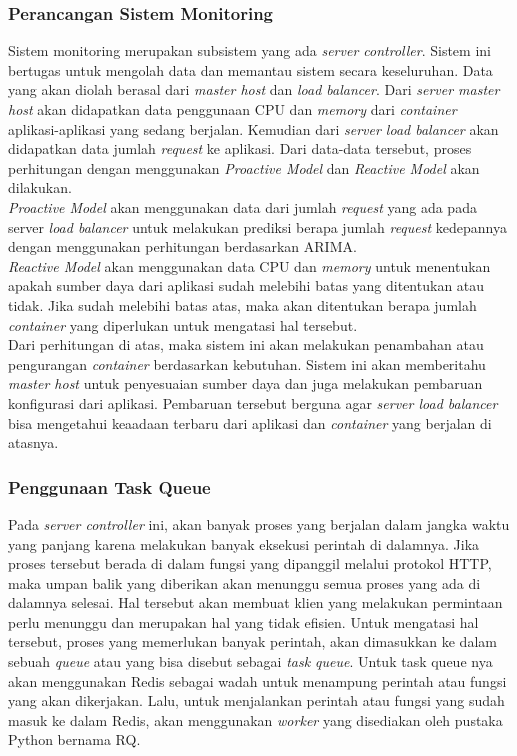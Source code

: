             \subsubsection{Perancangan Sistem Monitoring}
            	Sistem monitoring merupakan subsistem yang ada \textit{server controller}. Sistem ini bertugas untuk mengolah data dan memantau sistem secara keseluruhan. Data yang akan diolah berasal dari \textit{master host} dan \textit{load balancer}. Dari \textit{server master host} akan didapatkan data penggunaan CPU dan \textit{memory} dari \textit{container} aplikasi-aplikasi yang sedang berjalan. Kemudian dari \textit{server load balancer} akan didapatkan data jumlah \textit{request} ke aplikasi. Dari data-data tersebut, proses perhitungan dengan menggunakan \textit{Proactive Model} dan \textit{Reactive Model} akan dilakukan. \\
                \indent \textit{Proactive Model} akan menggunakan data dari jumlah \textit{request} yang ada pada server \textit{load balancer} untuk melakukan prediksi berapa jumlah \textit{request} kedepannya dengan menggunakan perhitungan berdasarkan ARIMA. \\
                \indent \textit{Reactive Model} akan menggunakan data CPU dan \textit{memory} untuk menentukan apakah sumber daya dari aplikasi sudah melebihi batas yang ditentukan atau tidak. Jika sudah melebihi batas atas, maka akan ditentukan berapa jumlah \textit{container} yang diperlukan untuk mengatasi hal tersebut. \\
                \indent Dari perhitungan di atas, maka sistem ini akan melakukan penambahan atau pengurangan \textit{container} berdasarkan kebutuhan. Sistem ini akan memberitahu \textit{master host} untuk penyesuaian sumber daya dan juga melakukan pembaruan konfigurasi dari aplikasi. Pembaruan tersebut berguna agar \textit{server load balancer} bisa mengetahui keaadaan terbaru dari aplikasi dan \textit{container} yang berjalan di atasnya.
                
            \subsubsection{Penggunaan Task Queue}
            	Pada \textit{server controller} ini, akan banyak proses yang berjalan dalam jangka waktu yang panjang karena melakukan banyak eksekusi perintah di dalamnya. Jika proses tersebut berada di dalam fungsi yang dipanggil melalui protokol HTTP, maka umpan balik yang diberikan akan menunggu semua proses yang ada di dalamnya selesai. Hal tersebut akan membuat klien yang melakukan permintaan perlu menunggu dan merupakan hal yang tidak efisien. Untuk mengatasi hal tersebut, proses yang memerlukan banyak perintah, akan dimasukkan ke dalam sebuah \textit{queue} atau yang bisa disebut sebagai \textit{task queue}. Untuk task queue nya akan menggunakan Redis sebagai wadah untuk menampung perintah atau fungsi yang akan dikerjakan. Lalu, untuk menjalankan perintah atau fungsi yang sudah masuk ke dalam Redis, akan menggunakan \textit{worker} yang disediakan oleh pustaka Python bernama RQ.
            
